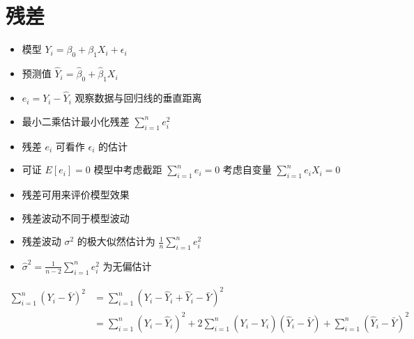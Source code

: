 \documentclass[]{book}
\providecommand{\tightlist}{%
  \setlength{\itemsep}{0pt}\setlength{\parskip}{0pt}}
\begin{document}
\section{残差}

\begin{itemize}
\tightlist
\item
  模型 \(Y_i = \beta_0 + \beta_1 X_i + \epsilon_i\)
\item
  预测值 \(\hat Y_i = \hat \beta_0 + \hat \beta_1 X_i\)
\item
  \(e_i = Y_i - \hat Y_i\) 观察数据与回归线的垂直距离
\item
  最小二乘估计最小化残差 \(\sum_{i=1}^n e_i^2\)
\item
  残差 \(e_i\) 可看作 \(\epsilon_i\) 的估计
\item
  可证 \(E[e_i] = 0\) 模型中考虑截距 \(\sum_{i=1}^n e_i = 0\) 考虑自变量 \(\sum_{i=1}^n e_i X_i = 0\)
\item
  残差可用来评价模型效果
\item
  残差波动不同于模型波动
\item
  残差波动 \(\sigma^2\) 的极大似然估计为 \(\frac{1}{n}\sum_{i=1}^n e_i^2\)
\item
  \(\hat \sigma^2 = \frac{1}{n-2}\sum_{i=1}^n e_i^2\) 为无偏估计
\end{itemize}

\begin{align}
\sum_{i=1}^n (Y_i - \bar Y)^2 
& = \sum_{i=1}^n (Y_i - \hat Y_i + \hat Y_i - \bar Y)^2 \\
& = \sum_{i=1}^n (Y_i - \hat Y_i)^2 + 
2 \sum_{i=1}^n  (Y_i - \hat Y_i)(\hat Y_i - \bar Y) + 
\sum_{i=1}^n  (\hat Y_i - \bar Y)^2 \\
\end{align}
\end{document}
